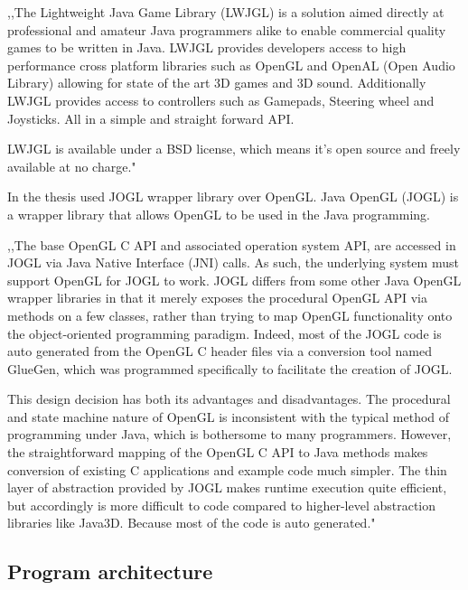 ,,The Lightweight Java Game Library (LWJGL) is a solution aimed directly at professional and amateur Java programmers alike to enable commercial quality games to be written in Java. LWJGL provides developers access to high performance cross platform libraries such as OpenGL and OpenAL (Open Audio Library) allowing for state of the art 3D games and 3D sound. Additionally LWJGL provides access to controllers such as Gamepads, Steering wheel and Joysticks. All in a simple and straight forward API.

LWJGL is available under a BSD license, which means it's open source and freely available at no charge."~\cite{LWJGL}


In the thesis used JOGL wrapper library over OpenGL. Java OpenGL (JOGL) is a wrapper library that allows OpenGL to be used in the Java programming.


,,The base OpenGL C API and associated operation system API, are accessed in JOGL via Java Native Interface (JNI) calls. As such, the underlying system must support OpenGL for JOGL to work. JOGL differs from some other Java OpenGL wrapper libraries in that it merely exposes the procedural OpenGL API via methods on a few classes, rather than trying to map OpenGL functionality onto the object-oriented programming paradigm. Indeed, most of the JOGL code is auto generated from the OpenGL C header files via a conversion tool named GlueGen, which was programmed specifically to facilitate the creation of JOGL.


This design decision has both its advantages and disadvantages. The procedural and state machine nature of OpenGL is inconsistent with the typical method of programming under Java, which is bothersome to many programmers. However, the straightforward mapping of the OpenGL C API to Java methods makes conversion of existing C applications and example code much simpler. The thin layer of abstraction provided by JOGL makes runtime execution quite efficient, but accordingly is more difficult to code compared to higher-level abstraction libraries like Java3D. Because most of the code is auto generated."~\cite{JOGL}


\subsection{Program architecture}

